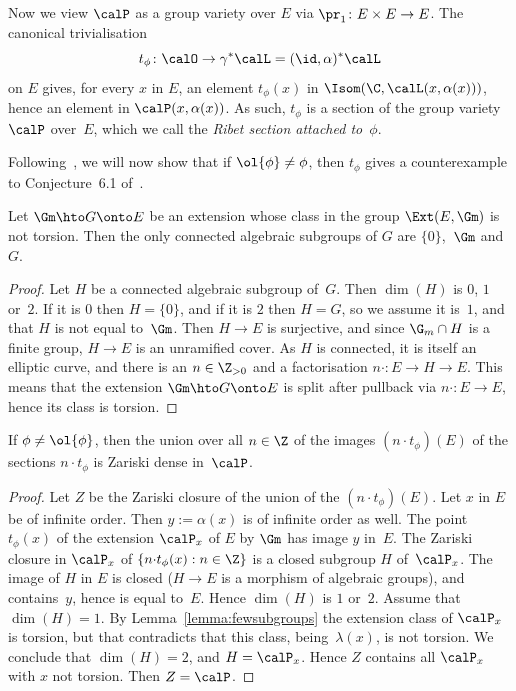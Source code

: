Now we view $\calP$ as a group variety over $E$ via $\pr_1\colon
E\times E\to E$.
The canonical trivialisation
\begin{equation}\label{eq:def_t_phi}
t_\phi\colon\calO\to\gamma^*\calL = (\id,\alpha)^*\calL
\end{equation}
on $E$ gives, for every $x$ in $E$, an element $t_\phi(x)$ in
$\Isom(\C,\calL(x,\alpha(x)))$, hence an element in
$\calP(x,\alpha(x))$. As such, $t_\phi$ is a section of the group variety
$\calP$ over~$E$, which we call the \emph{Ribet section attached
to~$\phi$}.

Following~\cite{Bertrand11}, we will now show that if
$\ol{\phi}\neq\phi$, then $t_\phi$ gives a
counterexample to Conjecture~6.1 of~\cite{Pink2}.

\begin{Lemma}\label{lemma:fewsubgroups}
Let $\Gm\hto G \onto E$ be an extension whose
class in the group $\Ext(E,\Gm)$ is not torsion. Then the only connected
algebraic subgroups of $G$ are $\{0\}$,~$\Gm$ and~$G$.
\end{Lemma}
\begin{proof}
Let $H$ be a connected algebraic subgroup of~$G$. Then $\dim(H)$ is
$0$, $1$ or~$2$. If it is $0$ then $H=\{0\}$, and if it is $2$ then
$H=G$, so we assume it is~$1$, and that $H$ is not equal
to~$\Gm$. Then $H\to E$ is surjective, and since $\G_m \cap H$ is a
finite group, $H\to E$ is an unramified cover. As $H$ is connected,
it is itself an elliptic curve, and there is an $n\in\Z_{>0}$ and a
factorisation $n{\cdot}\colon E\to H\to E$. This means that the
extension $\Gm\hto G\onto E$ is split after
pullback via $n{\cdot}\colon E\to E$, hence its class is torsion.
\end{proof}

\begin{Lemma}\label{lemma:tgeneric}
If $\phi\neq\ol{\phi}$, then the union over all $n\in\Z$ of the
images $(n{\cdot}t_\phi)(E)$ of the sections $n{\cdot}t_\phi$ is
Zariski dense in~$\calP$.
\end{Lemma}
\begin{proof}
Let $Z$ be the Zariski closure of the union of the
$(n{\cdot}t_\phi)(E)$. Let $x$ in $E$ be of infinite order. Then
$y:=\alpha(x)$ is of infinite order as well. The point $t_\phi(x)$
of the extension $\calP_x$ of $E$ by $\Gm$ has image $y$ in~$E$. The
Zariski closure in $\calP_x$ of $\{n{\cdot}t_\phi(x) : n\in\Z\}$ is
a closed subgroup $H$ of~$\calP_x$. The image of $H$ in $E$ is
closed ($H\to E$ is a morphism of algebraic groups), and
contains~$y$, hence is equal to~$E$. Hence $\dim(H)$ is $1$
or~$2$. Assume that $\dim(H)=1$. By Lemma~\ref{lemma:fewsubgroups}
the extension class of $\calP_x$ is torsion, but that contradicts
that this class, being~$\lambda(x)$, is not torsion. We conclude
that $\dim(H)=2$, and $H=\calP_x$. Hence $Z$ contains all $\calP_x$
with $x$ not torsion. Then $Z=\calP$.
\end{proof}

